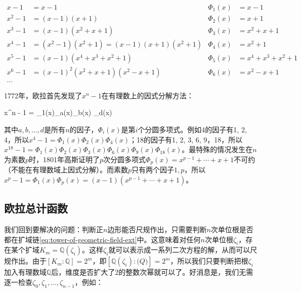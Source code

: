 \begin{align*}
x - 1 &= x - 1 & \Phi_1(x) &= x - 1 \\
x^2 - 1 &= (x - 1)(x + 1) & \Phi_2(x) &= x + 1 \\
x^3 - 1 &= (x - 1)(x^2 + x + 1) & \Phi_3(x) &= x^2 + x + 1 \\
x^4 - 1 &= (x^2 - 1)(x^2 + 1) = (x - 1)(x + 1)(x^2 + 1) & \Phi_4(x) &= x^2 + 1 \\
x^5 - 1 &= (x - 1)(x^4 + x^3 + x^2 + 1) & \Phi_5(x) &= x^4 + x^3 + x^2 + 1 \\
x^6 - 1 &= (x - 1)^2(x^2 + x + 1)(x^2 - x + 1) & \Phi_6(x) &= x^2 - x + 1 \\
\dotso
\end{align*}

1772年，欧拉首先发现了$x^n - 1$在有理数上的因式分解方法\cite{LinKailiang-2025}：

\be
x^n - 1 = \Phi_1(x)\Phi_a(x)\Phi_b(x) \dotsm \Phi_d(x)
\ee

其中$a, b, \dotsc, d$是所有$n$的因子，$\Phi_i(x)$是第$i$个分圆多项式。例如4的因子有1, 2, 4，所以$x^4 - 1 = \Phi_1(x)\Phi_2(x)\Phi_4(x)$；18的因子有1, 2, 3, 6, 9，18，所以$x^{18} - 1 = \Phi_1(x)\Phi_2(x)\Phi_3(x)\Phi_6(x)\Phi_9(x)\Phi_{18}(x)$。最特殊的情况发生在$n$为素数$p$时，1801年高斯证明了$p$次分圆多项式$\Phi_p(x) = x^{p-1} + \dotsb + x + 1$不可约（不能在有理数域上因式分解）。而素数$p$只有两个因子$1, p$，所以$x^p - 1 = \Phi_1(x)\Phi_p(x) = (x - 1)(x^{p-1} + \dotsb + x + 1)$。

\subsection{欧拉总计函数}
我们回到要解决的问题：判断正$n$边形能否尺规作出，只需要判断$n$次单位根是否都在扩域链\cref{eq:tower-of-geometric-field-ext}中。这意味着对任何$n$次单位根$\zeta_i$，存在某个扩域$K_m = \mathbb{Q}(\zeta_i)$。这样$\zeta_i$就可以表示成一系列二次方程的解，从而可以尺规作出。由于$[K_m : \mathbb{Q}] = 2^m$，即$[\mathbb{Q}(\zeta_i) : \mathbb(Q)] = 2^m$，所以我们只要判断把根$\zeta_i$加入有理数域$\mathbb{Q}$后，维度是否扩大了2的整数次幂就可以了。好消息是，我们无需逐一检查$\zeta_0, \zeta_1, \dotsc, \zeta_{n-1}$，例如：

